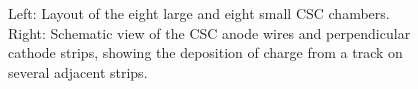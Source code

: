 \begin{figure}[htbp]
	\centering
	\caption{Left: Layout of the eight large and eight small CSC chambers. Right: Schematic view of the CSC anode wires and perpendicular cathode strips, showing the deposition of charge from a track on several adjacent strips.}
	\label{fig:ATLAS-MS-CSC}
\end{figure}


